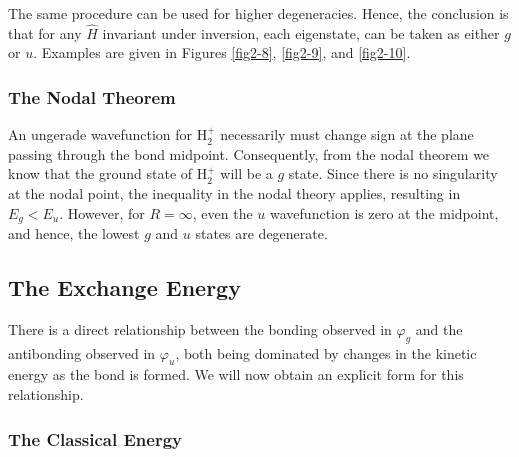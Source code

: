 The same procedure can be used for higher degeneracies. Hence, the
conclusion is that for any ${\hat H}$ invariant under inversion, each
eigenstate, can be taken as either $g$ or $u$.  Examples are given in
Figures \ref{fig2-8}, \ref{fig2-9}, and \ref{fig2-10}.

\subsubsection{The Nodal Theorem}
    
An ungerade wavefunction for H$^+_2$ necessarily must change sign at
the plane passing through the bond midpoint. Consequently, from the
nodal theorem we know that the ground state of H$^+_2$ will be a $g$
state. Since there is no singularity at the nodal point, the
inequality in the nodal theory applies, resulting in $E_g < E_u$.
However, for $R = \infty$, even the $u$ wavefunction is zero at the
midpoint, and hence, the lowest $g$ and $u$ states are degenerate.

\subsection{The Exchange Energy}
    
There is a direct relationship between the bonding observed in 
$\varphi_{g}$ and the antibonding observed in $\varphi_u$, both being
dominated by changes in the kinetic energy as the bond is formed. We
will now obtain an explicit form for this relationship.

\subsubsection{The Classical Energy}

